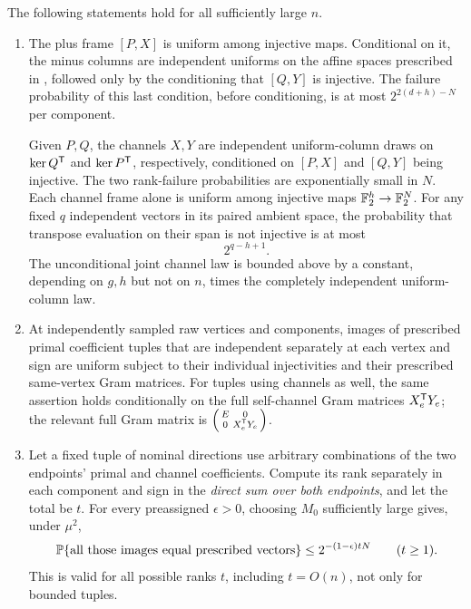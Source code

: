 \begin{lemma}\label{lem:frame-images}
The following statements hold for all sufficiently large \(n\).
\begin{enumerate}[label=\textup{(\alph*)}]
\item
The plus frame \([P,X]\) is uniform among injective maps.
Conditional on it, the minus columns are independent uniforms on the affine spaces prescribed in , followed only by the conditioning that \([Q,Y]\) is injective.
The failure probability of this last condition, before conditioning, is at most \(2^{2(d+h)-N}\) per component.

Given \(P,Q\), the channels \(X,Y\) are independent uniform-column draws on \(\ker Q^{\mathsf T}\) and \(\ker P^{\mathsf T}\), respectively, conditioned on \([P,X]\) and \([Q,Y]\) being injective.
The two rank-failure probabilities are exponentially small in \(N\).
Each channel frame alone is uniform among injective maps \(\mathbb F_2^h\to\mathbb F_2^N\).
For any fixed \(q\) independent vectors in its paired ambient space, the probability that transpose evaluation on their span is not injective is at most
\begin{equation}\label{eq:channel-transpose-failure}
 2^{q-h+1}.
\end{equation}
The unconditional joint channel law is bounded above by a constant, depending on \(g,h\) but not on \(n\), times the completely independent uniform-column law.

\item
At independently sampled raw vertices and components, images of prescribed primal coefficient tuples that are independent separately at each vertex and sign are uniform subject to their individual injectivities and their prescribed same-vertex Gram matrices.
For tuples using channels as well, the same assertion holds conditionally on the full self-channel Gram matrices \(X_e^{\mathsf T} Y_e\); the relevant full Gram matrix is
\(\begin{psmallmatrix}E&0\\0&X_e^{\mathsf T} Y_e\end{psmallmatrix}\).

\item
Let a fixed tuple of nominal directions use arbitrary combinations of the two endpoints' primal and channel coefficients.
Compute its rank separately in each component and sign in the \emph{direct sum over both endpoints}, and let the total be \(t\).
For every preassigned \(\epsilon>0\), choosing \(M_0\) sufficiently large gives, under \(\mu^2\),
\begin{equation}\label{eq:reference-image-cap}
 \mathbb P\{\text{all those images equal prescribed vectors}\}
 \le 2^{-(1-\epsilon)tN}\qquad(t\ge1).
\end{equation}
This is valid for all possible ranks \(t\), including \(t=O(n)\), not only for bounded tuples.
\end{enumerate}
\end{lemma}
